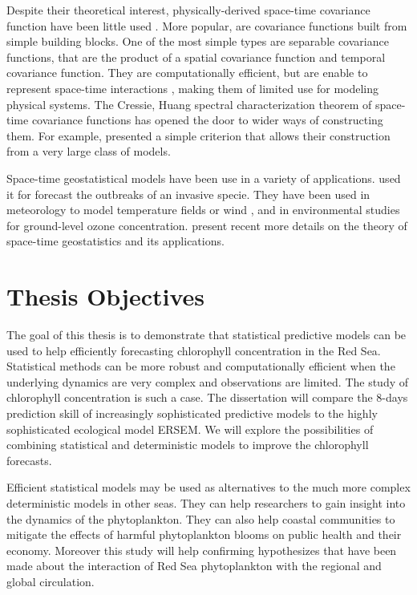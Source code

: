 Despite their theoretical interest, physically-derived space-time covariance function have been little used \cite{Gneiting2010}. More popular, are covariance functions built from simple building blocks. One of the most simple types are separable covariance functions, that are the product of a spatial covariance function and temporal covariance function. They are computationally efficient, but are enable to represent space-time interactions \cite{Cressie1999, Stein2005}, making them of limited use for modeling physical systems. The Cressie, Huang spectral characterization theorem of space-time covariance functions has opened the door to wider ways of constructing them. For example, \cite{Gneiting2002} presented a simple criterion that allows their construction from a very large class of models. 

Space-time geostatistical models have been use in a variety of applications. \cite{Hohn1993} used it for forecast the outbreaks of an invasive specie. They have been used in meteorology to model temperature fields \cite{Handcock1994, North2011} or wind \cite{Cressie1999, Gneiting2002}, and in environmental studies for ground-level ozone concentration. \cite{Gneiting2007, Gneiting2010} present recent more details on the theory of space-time geostatistics and its applications.  

\section{Thesis Objectives}

The goal of this thesis is to demonstrate that statistical predictive models can be used to help efficiently forecasting chlorophyll concentration in the Red Sea. Statistical methods can be more robust and computationally efficient when the underlying dynamics are very complex and observations are limited. The study of chlorophyll concentration is such a case. The dissertation will compare the 8-days prediction skill of increasingly sophisticated predictive models to the highly sophisticated ecological model ERSEM. We will explore the possibilities of combining statistical and deterministic models to improve the chlorophyll forecasts.

Efficient statistical models may be used as alternatives to the much more complex deterministic models in other seas. They can help researchers to gain insight into the dynamics of the phytoplankton. They can also help coastal communities to mitigate the effects of harmful phytoplankton blooms on public health and their economy. Moreover this study will help confirming hypothesizes that have been made about the interaction of Red Sea phytoplankton with the regional and global circulation. 

